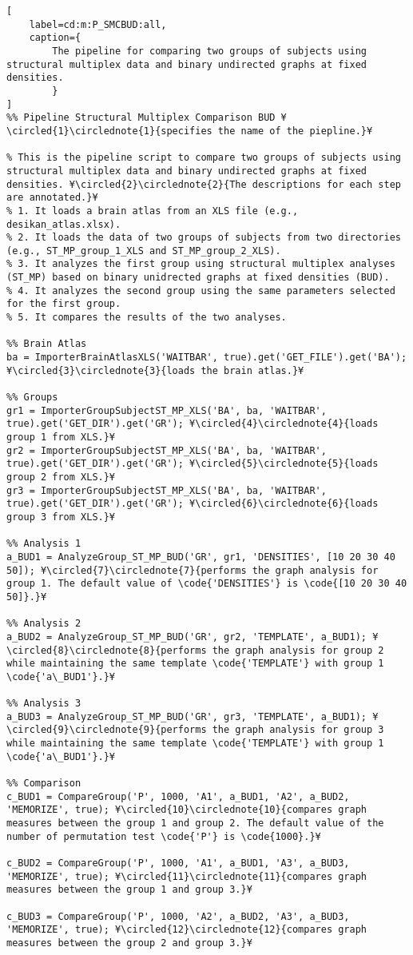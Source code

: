\documentclass{tufte-handout}
\begin{document}
\begin{lstlisting}[
	label=cd:m:P_SMCBUD:all,
	caption={
		The pipeline for comparing two groups of subjects using structural multiplex data and binary undirected graphs at fixed densities.
		}
]
%% Pipeline Structural Multiplex Comparison BUD ¥\circled{1}\circlednote{1}{specifies the name of the piepline.}¥

% This is the pipeline script to compare two groups of subjects using structural multiplex data and binary undirected graphs at fixed densities. ¥\circled{2}\circlednote{2}{The descriptions for each step are annotated.}¥
% 1. It loads a brain atlas from an XLS file (e.g., desikan_atlas.xlsx).
% 2. It loads the data of two groups of subjects from two directories (e.g., ST_MP_group_1_XLS and ST_MP_group_2_XLS).
% 3. It analyzes the first group using structural multiplex analyses (ST_MP) based on binary unidrected graphs at fixed densities (BUD).
% 4. It analyzes the second group using the same parameters selected for the first group.
% 5. It compares the results of the two analyses.

%% Brain Atlas
ba = ImporterBrainAtlasXLS('WAITBAR', true).get('GET_FILE').get('BA'); ¥\circled{3}\circlednote{3}{loads the brain atlas.}¥

%% Groups
gr1 = ImporterGroupSubjectST_MP_XLS('BA', ba, 'WAITBAR', true).get('GET_DIR').get('GR'); ¥\circled{4}\circlednote{4}{loads group 1 from XLS.}¥
gr2 = ImporterGroupSubjectST_MP_XLS('BA', ba, 'WAITBAR', true).get('GET_DIR').get('GR'); ¥\circled{5}\circlednote{5}{loads group 2 from XLS.}¥
gr3 = ImporterGroupSubjectST_MP_XLS('BA', ba, 'WAITBAR', true).get('GET_DIR').get('GR'); ¥\circled{6}\circlednote{6}{loads group 3 from XLS.}¥

%% Analysis 1
a_BUD1 = AnalyzeGroup_ST_MP_BUD('GR', gr1, 'DENSITIES', [10 20 30 40 50]); ¥\circled{7}\circlednote{7}{performs the graph analysis for group 1. The default value of \code{'DENSITIES'} is \code{[10 20 30 40 50]}.}¥

%% Analysis 2
a_BUD2 = AnalyzeGroup_ST_MP_BUD('GR', gr2, 'TEMPLATE', a_BUD1); ¥\circled{8}\circlednote{8}{performs the graph analysis for group 2 while maintaining the same template \code{'TEMPLATE'} with group 1 \code{'a\_BUD1'}.}¥

%% Analysis 3
a_BUD3 = AnalyzeGroup_ST_MP_BUD('GR', gr3, 'TEMPLATE', a_BUD1); ¥\circled{9}\circlednote{9}{performs the graph analysis for group 3 while maintaining the same template \code{'TEMPLATE'} with group 1 \code{'a\_BUD1'}.}¥

%% Comparison
c_BUD1 = CompareGroup('P', 1000, 'A1', a_BUD1, 'A2', a_BUD2, 'MEMORIZE', true); ¥\circled{10}\circlednote{10}{compares graph measures between the group 1 and group 2. The default value of the number of permutation test \code{'P'} is \code{1000}.}¥

c_BUD2 = CompareGroup('P', 1000, 'A1', a_BUD1, 'A3', a_BUD3, 'MEMORIZE', true); ¥\circled{11}\circlednote{11}{compares graph measures between the group 1 and group 3.}¥

c_BUD3 = CompareGroup('P', 1000, 'A2', a_BUD2, 'A3', a_BUD3, 'MEMORIZE', true); ¥\circled{12}\circlednote{12}{compares graph measures between the group 2 and group 3.}¥
\end{lstlisting}
\end{document}
